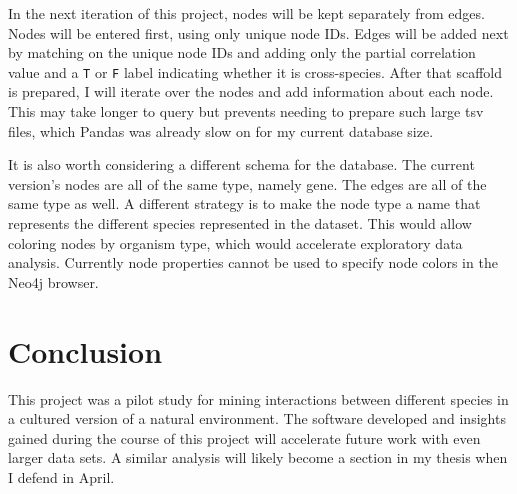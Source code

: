 \documentclass[12pt]{article}
\begin{document}
In the next iteration of this project, nodes will be kept separately from edges.
Nodes will be entered first, using only unique node IDs.
Edges will be added next by matching on the unique node IDs and adding only the partial correlation value and a \texttt{T} or \texttt{F} label indicating whether it is cross-species.
After that scaffold is prepared, I will iterate over the nodes and add information about each node.  
This may take longer to query but prevents needing to prepare such large tsv files, which Pandas was already slow on for my current database size. 

It is also worth considering a different schema for the database.
The current version's nodes are all of the same type, namely gene.  
The edges are all of the same type as well. 
A different strategy is to make the node type a name that represents the different species represented in the dataset.
This would allow coloring nodes by organism type, which would accelerate exploratory data analysis. 
Currently node properties cannot be used to specify node colors in the Neo4j browser. 


\section{Conclusion}
This project was a pilot study for mining interactions between different species in a cultured version of a natural environment.
The software developed and insights gained during the course of this project will accelerate future work with even larger data sets. 
A similar analysis will likely become a section in my thesis when I defend in April. 



 
 
\end{document}
